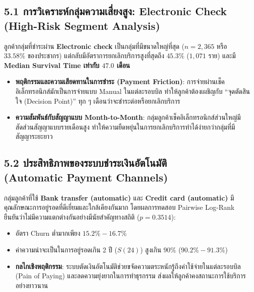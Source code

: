 \documentclass[12pt,a4paper]{article}
\begin{document}
\subsection*{5.1 การวิเคราะห์กลุ่มความเสี่ยงสูง: Electronic Check\\ \normalsize(High-Risk Segment Analysis)}
ลูกค้ากลุ่มที่ชำระผ่าน \textbf{Electronic check} เป็นกลุ่มที่มีขนาดใหญ่ที่สุด ($n = 2,365$ หรือ $33.58\%$ ของประชากร) แต่กลับมีอัตราการยกเลิกบริการสูงที่สุดถึง \textbf{$45.3\%$} ($1,071$ ราย) และมี \textbf{Median Survival Time เท่ากับ $47.0$ เดือน} 
\begin{itemize}[leftmargin=18pt, itemsep=2pt]
    \item \textbf{พฤติกรรมและความเสียดทานในการชำระ (Payment Friction)}: การจ่ายผ่านเช็คอิเล็กทรอนิกส์มักเป็นการจ่ายแบบ Manual ในแต่ละรอบบิล ทำให้ลูกค้าต้องเผชิญกับ ``จุดตัดสินใจ (Decision Point)'' ทุก ๆ เดือนว่าจะชำระต่อหรือยกเลิกบริการ
    \item \textbf{ความสัมพันธ์กับสัญญาแบบ Month-to-Month}: กลุ่มลูกค้าเช็คอิเล็กทรอนิกส์ส่วนใหญ่มีสัดส่วนสัญญาแบบรายเดือนสูง ทำให้ความยืดหยุ่นในการยกเลิกบริการทำได้ง่ายกว่ากลุ่มที่มีสัญญาระยะยาว
\end{itemize}

\subsection*{5.2 ประสิทธิภาพของระบบชำระเงินอัตโนมัติ\\ \normalsize(Automatic Payment Channels)}
กลุ่มลูกค้าที่ใช้ \textbf{Bank transfer (automatic)} และ \textbf{Credit card (automatic)} มีคุณลักษณะการอยู่รอดที่ดีเยี่ยมและใกล้เคียงกันมาก โดยผลการทดสอบ Pairwise Log-Rank ยืนยันว่าไม่มีความแตกต่างกันอย่างมีนัยสำคัญทางสถิติ ($p = 0.3514$):
\begin{itemize}[leftmargin=18pt, itemsep=2pt]
    \item อัตรา Churn ต่ำมากเพียง $15.2\% - 16.7\%$ 
    \item ค่าความน่าจะเป็นในการอยู่รอดเกิน 2 ปี ($S(24)$) สูงเกิน $90\%$ ($90.2\% - 91.3\%$)
    \item \textbf{กลไกเชิงพฤติกรรม}: ระบบตัดเงินอัตโนมัติช่วยขจัดความตระหนักรู้ถึงค่าใช้จ่ายในแต่ละรอบบิล (Pain of Paying) และลดความยุ่งยากในการทำธุรกรรม ส่งผลให้ลูกค้าคงสถานะการใช้บริการอย่างยาวนาน
\end{itemize}
\end{document}
